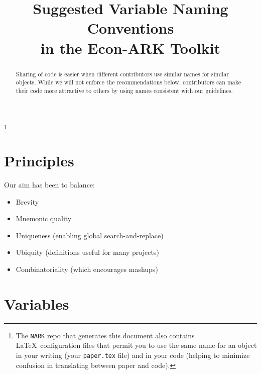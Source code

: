 \documentclass[12pt]{econtex}
\begin{document}



\title{Suggested Variable Naming Conventions \\ in the Econ-ARK Toolkit}


\vspace{2in}



\maketitle 


\begin{abstract}
  Sharing of code is easier when different contributors use similar names for similar objects.  While we will not enforce the
  recommendations below, contributors can make their code more attractive to others 
  by using names consistent with our guidelines.  
\end{abstract}

\thanks{The \texttt{NARK} repo that generates this document 
also contains \LaTeX~configuration files that permit you to use the same name for an object in 
your writing (your \texttt{paper.tex} file) and in your code (helping to minimize confusion in translating between paper and code).}


\pagebreak

\section{Principles}
Our aim has been to balance:
\begin{itemize}
\item Brevity 
\item Mnemonic quality
\item Uniqueness (enabling global search-and-replace)
\item Ubiquity (definitions useful for many projects)
\item Combinatoriality (which encourages mashups)
\end{itemize}


\pagebreak

\section{Variables}
\end{document}
